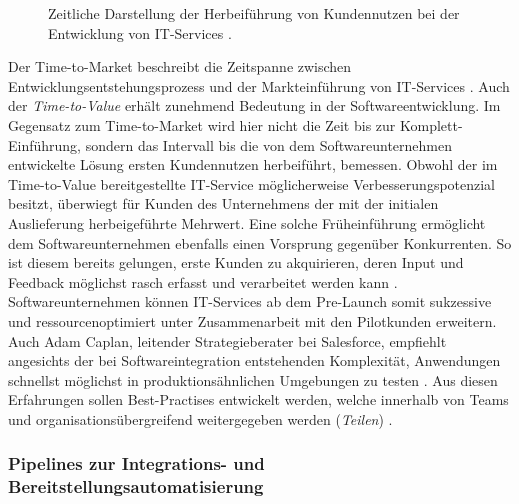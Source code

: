 \begin{center}
	\begin{figure}[H]
		\centering
		\caption[Zeitliche Darstellung der Herbeiführung von Kundennutzen bei der Entwicklung von IT-Services]{Zeitliche Darstellung der Herbeiführung von Kundennutzen bei der Entwicklung von IT-Services \cite[9]{Halstenberg.2020}.}
		\label{fig:TTM}
	\end{figure}
\end{center}
\vspace*{-15mm}
Der Time-to-Market beschreibt die Zeitspanne zwischen Entwicklungsentstehungsprozess und der Markteinführung von IT-Services \cite[141]{Vesey.1992}. Auch der \textit{Time-to-Value} erhält zunehmend Bedeutung in der Softwareentwicklung. Im Gegensatz zum Time-to-Market wird hier nicht die Zeit bis zur Komplett-Einführung, sondern das Intervall bis die von dem Softwareunternehmen entwickelte Lösung ersten Kundennutzen herbeiführt, bemessen. Obwohl der im Time-to-Value bereitgestellte IT-Service möglicherweise Verbesserungspotenzial besitzt, überwiegt für Kunden des Unternehmens der mit der initialen Auslieferung herbeigeführte Mehrwert. Eine solche Früheinführung ermöglicht dem Softwareunternehmen ebenfalls einen Vorsprung gegenüber Konkurrenten. So ist diesem bereits gelungen, erste Kunden zu akquirieren, deren Input und Feedback möglichst rasch erfasst und verarbeitet werden kann \cite[9]{Halstenberg.2020}. Softwareunternehmen können IT-Services ab dem Pre-Launch somit sukzessive und ressourcenoptimiert unter Zusammenarbeit mit den Pilotkunden erweitern. Auch Adam Caplan, leitender Strategieberater bei Salesforce, empfiehlt angesichts der bei Softwareintegration entstehenden Komplexität, Anwendungen schnellst möglichst in produktionsähnlichen Umgebungen zu testen \cite{Vesey.1992}. Aus diesen Erfahrungen sollen Best-Practises entwickelt werden, welche innerhalb von Teams und organisationsübergreifend weitergegeben werden (\textit{Teilen}) \cite[7]{Halstenberg.2020}. 

\subsubsection{Pipelines zur Integrations- und Bereitstellungsautomatisierung}

